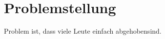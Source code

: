 \begin{center}
    \begin{minipage}[t]{\textwidth}
        \begin{center}
        \end{center}
    \end{minipage} 
\end{center}

\section{Problemstellung}
Problem ist, dass viele Leute einfach abgehoben\footnotemark\@ sind.
\cite{berger_test-_2012}\cite{grout_integrated_2006}\cite{karger_pruftechnik_1985}\cite{stiny_fertigung_2010}


